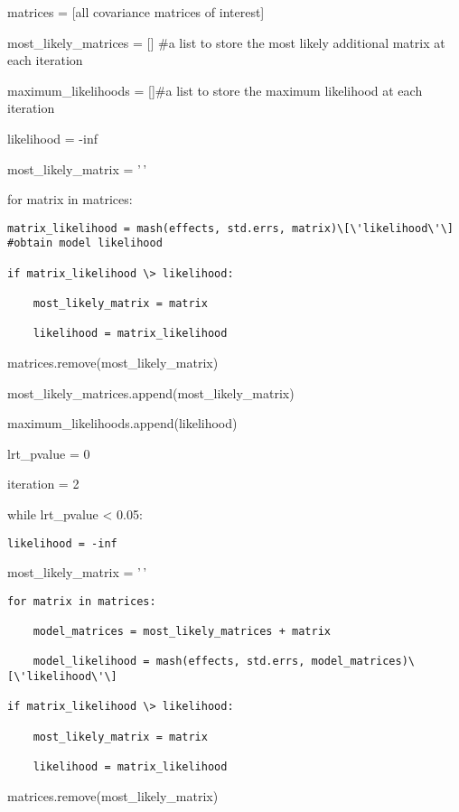 \documentclass[
  letterpaper,
  DIV=11,
  numbers=noendperiod]{scrartcl}
\begin{document}
matrices = {[}all covariance matrices of interest{]}

most\_likely\_matrices = {[}{]} \#a list to store the most likely
additional matrix at each iteration

maximum\_likelihoods = {[}{]}\#a list to store the maximum likelihood at
each iteration

\hfill\break

likelihood = -inf

most\_likely\_matrix = '\,'

for matrix in matrices:

\begin{verbatim}
matrix_likelihood = mash(effects, std.errs, matrix)\[\'likelihood\'\] #obtain model likelihood

if matrix_likelihood \> likelihood:

    most_likely_matrix = matrix

    likelihood = matrix_likelihood
\end{verbatim}

\hfill\break

matrices.remove(most\_likely\_matrix)

most\_likely\_matrices.append(most\_likely\_matrix)

maximum\_likelihoods.append(likelihood)

\hfill\break

lrt\_pvalue = 0

iteration = 2

while lrt\_pvalue \textless{} 0.05:

\begin{verbatim}
likelihood = -inf
\end{verbatim}

most\_likely\_matrix = '\,'

\begin{verbatim}
for matrix in matrices:

    model_matrices = most_likely_matrices + matrix 

    model_likelihood = mash(effects, std.errs, model_matrices)\[\'likelihood\'\]

if matrix_likelihood \> likelihood:

    most_likely_matrix = matrix

    likelihood = matrix_likelihood
\end{verbatim}

\hfill\break

matrices.remove(most\_likely\_matrix)
\end{document}
